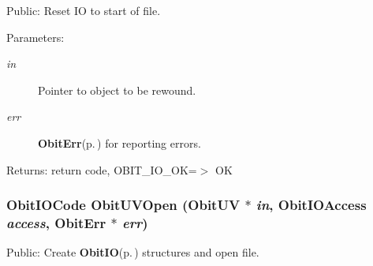 Public: Reset IO to start of file. 

\begin{Desc}
\item[Parameters:]
\begin{description}
\item[{\em in}]Pointer to object to be rewound. \item[{\em err}]{\bf Obit\-Err}{\rm (p.\,\pageref{structObitErr})} for reporting errors. \end{description}
\end{Desc}
\begin{Desc}
\item[Returns:]return code, OBIT\_\-IO\_\-OK=$>$ OK \end{Desc}
\subsubsection{\setlength{\rightskip}{0pt plus 5cm}Obit\-IOCode Obit\-UVOpen ({\bf Obit\-UV} $\ast$ {\em in}, Obit\-IOAccess {\em access}, {\bf Obit\-Err} $\ast$ {\em err})}\label{ObitUV_8c_a19}


Public: Create {\bf Obit\-IO}{\rm (p.\,\pageref{structObitIO})} structures and open file. 

